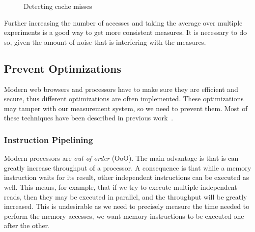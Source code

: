 \documentclass[a4paper,11pt,oneside]{report}
\begin{document}
\begin{figure}
    \centering
    \caption{Detecting cache misses}
    \label{fig:measurement_system}
\end{figure}

Further increasing the number of accesses and taking the average over multiple experiments is a good way to get more consistent measures. It is necessary to do so, given the amount of noise that is interfering with the measures.

\subsection{Prevent Optimizations}

Modern web browsers and processors have to make sure they are efficient and secure, thus different optimizations are often implemented. These optimizations may tamper with our measurement system, so we need to prevent them. Most of these techniques have been described in previous work~\cite{aleph_spectre}.

\subsubsection{Instruction Pipelining}

Modern processors are \emph{out-of-order} (OoO). The main advantage is that is can greatly increase throughput of a processor. A consequence is that while a memory instruction waits for its result, other independent instructions can be executed as well. This means, for example, that if we try to execute multiple independent reads, then they may be executed in parallel, and the throughput will be greatly increased. This is undesirable as we need to precisely measure the time needed to perform the memory accesses, we want memory instructions to be executed one after the other.
\end{document}
